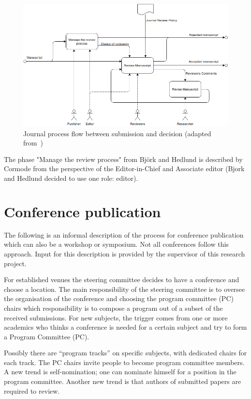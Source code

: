 \documentclass{ou-report}
\begin{document}
\begin{figure}[H]
\centering
\includegraphics[width=14cm]{images/bh2004_dia_a22331_part.drawio.png}
\caption{Journal process flow between submission and decision (adapted
from~\cite[diagram A22331]{BH2004})}
\label{fig:bh2004_a22331}
\end{figure}
The phase "Manage the review process" from Bj\"ork and Hedlund is described by 
Cormode from the perspective of the Editor-in-Chief and Associate editor (Bjork 
and Hedlund decided to use one role: editor). 


\section{Conference publication}
The following is an informal description of the process for conference 
publication which can also be a workshop or symposium. Not all conferences 
follow this approach. Input for this description is provided by the supervisor
of this research project.

For established venues the steering committee decides to have a conference and 
choose a location. The main responsibility of the steering committee is to 
oversee the organisation of the conference and choosing the program 
committee (PC) chairs which responsibility is to compose a program out of a 
subset of the received 
submissions. For new subjects, the trigger comes from one or more 
academics who thinks a conference is needed for a certain subject and try to 
form a Program Committee (PC). 

Possibly there are ``program tracks'' on specific subjects, with dedicated
chairs for each track.
The PC chairs invite people to become program 
committee members. A new trend is self-nomination; one can nominate himself for 
a position in the program committee. Another new trend is that authors of 
submitted papers are required to review.
\end{document}
